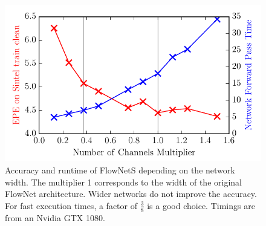 \documentclass[10pt,twocolumn,letterpaper]{article}%
\begin{document}
\begin{figure}
  \begin{center}
      \includegraphics[width=\linewidth]{figures/channel-factors-eps-converted-to.pdf}
  \end{center}
  \caption{Accuracy and runtime of FlowNetS depending on the network width. The multiplier 1 corresponds to the width of the original FlowNet architecture. Wider networks do not improve the accuracy. For fast execution times, a factor of $\frac{3}{8}$ is a good choice. Timings are from an Nvidia GTX 1080.
  }
  \label{fig:channel-factors}
\end{figure}%

\newcommand{\tm}[1]{\textcolor{black}{$#1$ms}}	
\newcommand{\arch}[1]{\textcolor{black}{#1}}	
\newcommand{\nweights}[1]{$#1$}	
\newcommand{\epe}[1]{$#1$}	

\newcommand{\tmlabel}[1]{\textcolor{black}{#1}}	
\newcommand{\archlabel}[1]{\textcolor{black}{#1}}	
\newcommand{\weightslabel}[1]{#1}	
\newcommand{\epelabel}[1]{#1}	
\end{document}
